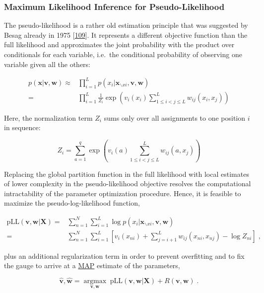 \documentclass[11pt,a4paper,twoside]{book}
\newcommand{\seq}{\mathbf{x}}
\renewcommand{\v}{\mathbf{v}}
\newcommand{\w}{\mathbf{w}}
\theoremstyle{definition}
\theoremstyle{definition}
\theoremstyle{remark}
\begin{document}
\subsubsection{Maximum Likelihood Inference for
Pseudo-Likelihood}\label{pseudo-likelihood}

The pseudo-likelihood is a rather old estimation principle that was
suggested by Besag already in 1975
{[}\protect\hyperlink{ref-Besag1975}{109}{]}. It represents a different
objective function than the full likelihood and approximates the joint
probability with the product over conditionals for each variable,
i.e.~the conditional probability of observing one variable given all the
others:

\begin{align}
  p(\seq | \v,\w) \approx&   \prod_{i=1}^L p(x_i | \seq_{\backslash xi}, \v,\w) \nonumber \\
                        =&  \prod_{i=1}^L \frac{1}{Z_i} \exp \left(  v_i(x_i) \sum_{1 \leq i < j \leq L}^L w_{ij}(x_i, x_j) \right)
\end{align}

Here, the normalization term \(Z_i\) sums only over all assignments to
one position \(i\) in sequence:

\begin{equation}
  Z_i = \sum_{a=1}^{q} \exp \left( v_i(a) \sum_{1 \leq i < j \leq L}^L w_{ij}(a, x_j) \right)
\label{eq:partition-fct-pll}
\end{equation}

Replacing the global partition function in the full likelihood with
local estimates of lower complexity in the pseudo-likelihood objective
resolves the computational intractability of the parameter optimization
procedure. Hence, it is feasible to maximize the pseudo-log-likelihood
function,

\begin{align}
    \text{pLL}(\v, \w | \mathbf{X}) =& \sum_{n=1}^N \sum_{i=1}^L \log p(x_i | \seq_{\backslash xi}, \v,\w) \nonumber \\
    =& \sum_{n=1}^N \sum_{i=1}^L  \left[ v_i(x_{ni}) + \sum_{j=i+1}^L  w_{ij}(x_{ni}, x_{nj}) - \log Z_{ni} \right] \;,
\end{align}

plus an additional regularization term in order to prevent overfitting
and to fix the gauge to arrive at a \protect\hyperlink{abbrev}{MAP}
estimate of the parameters,

\begin{equation}
    \hat{\v}, \hat{\w} = \underset{\v, \w}{\operatorname{argmax}} \; \text{pLL}(\v, \w | \mathbf{X}) + R(\v, \w) \; .
\end{equation}
\end{document}

